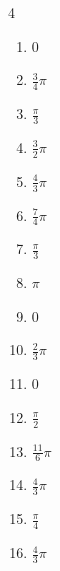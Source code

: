 \begin{multicols}{4}
\begin{enumerate}
\columnbreak %

\resetques

  \item $\displaystyle 0$

  \item $\displaystyle \frac{3}{4}\pi$

  \item $\displaystyle \frac{\pi}{3}$

  \item $\displaystyle \frac{3}{2}\pi$

  \item $\displaystyle \frac{4}{3}\pi$

  \item $\displaystyle \frac{7}{4}\pi$

  \item $\displaystyle \frac{\pi}{3}$

  \item $\displaystyle \pi$

  \item $\displaystyle 0$

  \item $\displaystyle \frac{2}{3}\pi$

  \item $\displaystyle 0$

  \item $\displaystyle \frac{\pi}{2}$

  \item $\displaystyle \frac{11}{6}\pi$

  \item $\displaystyle \frac{4}{3}\pi$

  \item $\displaystyle \frac{\pi}{4}$

  \item $\displaystyle \frac{4}{3}\pi$


\end{enumerate}
\end{multicols}
